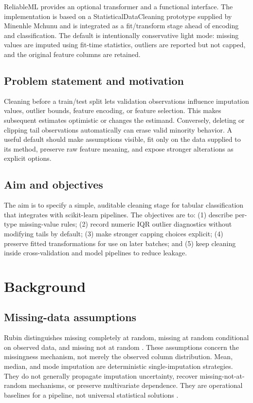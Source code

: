 \documentclass[conference]{IEEEtran}
\begin{document}
ReliableML provides an optional  transformer and a functional  interface. The implementation is based on a StatisticalDataCleaning prototype supplied by Minenhle Mchunu and is integrated as a fit/transform stage ahead of encoding and classification. The default is intentionally conservative light mode: missing values are imputed using fit-time statistics, outliers are reported but not capped, and the original feature columns are retained.

\subsection{Problem statement and motivation}
Cleaning before a train/test split lets validation observations influence imputation values, outlier bounds, feature encoding, or feature selection. This makes subsequent estimates optimistic or changes the estimand. Conversely, deleting or clipping tail observations automatically can erase valid minority behavior. A useful default should make assumptions visible, fit only on the data supplied to its  method, preserve raw feature meaning, and expose stronger alterations as explicit options.

\subsection{Aim and objectives}
The aim is to specify a simple, auditable cleaning stage for tabular classification that integrates with scikit-learn pipelines. The objectives are to: (1) describe per-type missing-value rules; (2) record numeric IQR outlier diagnostics without modifying tails by default; (3) make stronger capping choices explicit; (4) preserve fitted transformations for use on later batches; and (5) keep cleaning inside cross-validation and model pipelines to reduce leakage.

\section{Background}
\subsection{Missing-data assumptions}
Rubin distinguishes missing completely at random, missing at random conditional on observed data, and missing not at random \cite{rubin1976}. These assumptions concern the missingness mechanism, not merely the observed column distribution. Mean, median, and mode imputation are deterministic single-imputation strategies. They do not generally propagate imputation uncertainty, recover missing-not-at-random mechanisms, or preserve multivariate dependence. They are operational baselines for a pipeline, not universal statistical solutions \cite{little2002}.
\end{document}

